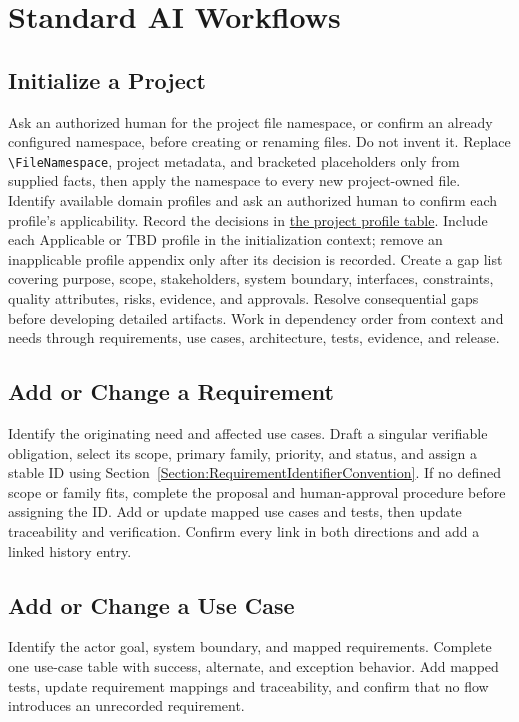\section{Standard AI Workflows}
\label{Section:AIArchitectureWorkflow}

\subsection{Initialize a Project}
Ask an authorized human for the project file namespace, or confirm an already
configured namespace, before creating or renaming files. Do not invent it.
Replace \verb|\FileNamespace|, project metadata, and bracketed placeholders
only from supplied facts, then apply the namespace to every new project-owned
file.
Identify available domain profiles and ask an authorized human to confirm each
profile's applicability. Record the decisions in
\hyperref[Table:ProjectDomainProfiles]{the project profile table}. Include each
Applicable or TBD profile in the initialization context; remove an
inapplicable profile appendix only after its decision is recorded.
Create a gap list covering purpose, scope, stakeholders, system boundary,
interfaces, constraints, quality attributes, risks, evidence, and approvals.
Resolve consequential gaps before developing detailed artifacts. Work in
dependency order from context and needs through requirements, use cases,
architecture, tests, evidence, and release.

\subsection{Add or Change a Requirement}
Identify the originating need and affected use cases. Draft a singular
verifiable obligation, select its scope, primary family, priority, and status,
and assign a stable ID using
Section~\ref{Section:RequirementIdentifierConvention}. If no defined scope or
family fits, complete the proposal and human-approval procedure before
assigning the ID. Add or update mapped use cases and tests, then update
traceability and verification. Confirm every link in both directions and add a
linked history entry.

\subsection{Add or Change a Use Case}
Identify the actor goal, system boundary, and mapped requirements. Complete one
use-case table with success, alternate, and exception behavior. Add mapped
tests, update requirement mappings and traceability, and confirm that no flow
introduces an unrecorded requirement.

